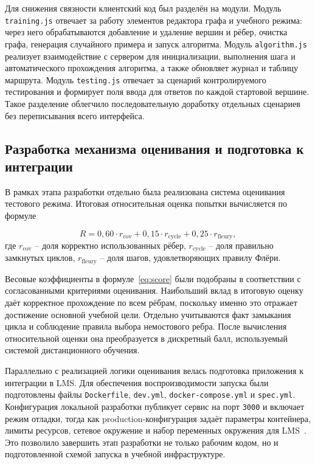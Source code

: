 \documentclass[a4paper,12pt]{extarticle}
\begin{document}
Для снижения связности клиентский код был разделён на модули. Модуль \texttt{training.js} отвечает за работу элементов редактора графа и учебного режима: через него обрабатываются добавление и удаление вершин и рёбер, очистка графа, генерация случайного примера и запуск алгоритма. Модуль \texttt{algorithm.js} реализует взаимодействие с сервером для инициализации, выполнения шага и автоматического прохождения алгоритма, а также обновляет журнал и таблицу маршрута. Модуль \texttt{testing.js} отвечает за сценарий контролируемого тестирования и формирует поля ввода для ответов по каждой стартовой вершине. Такое разделение облегчило последовательную доработку отдельных сценариев без переписывания всего интерфейса.

\subsection{Разработка механизма оценивания и подготовка к интеграции}

В рамках этапа разработки отдельно была реализована система оценивания тестового режима. Итоговая относительная оценка попытки вычисляется по формуле

\begin{equation}
R = 0{,}60 \cdot r_{\text{cov}} + 0{,}15 \cdot r_{\text{cycle}} + 0{,}25 \cdot r_{\text{fleury}},
\label{eq:score}
\end{equation}
где $r_{\text{cov}}$ -- доля корректно использованных рёбер, $r_{\text{cycle}}$ -- доля правильно замкнутых циклов, $r_{\text{fleury}}$ -- доля шагов, удовлетворяющих правилу Флёри.

Весовые коэффициенты в формуле~\eqref{eq:score} были подобраны в соответствии с согласованными критериями оценивания. Наибольший вклад в итоговую оценку даёт корректное прохождение по всем рёбрам, поскольку именно это отражает достижение основной учебной цели. Отдельно учитываются факт замыкания цикла и соблюдение правила выбора немостового ребра. После вычисления относительной оценки она преобразуется в дискретный балл, используемый системой дистанционного обучения.

Параллельно с реализацией логики оценивания велась подготовка приложения к интеграции в LMS. Для обеспечения воспроизводимости запуска были подготовлены файлы \texttt{Dockerfile}, \texttt{dev.yml}, \texttt{docker-compose.yml} и \texttt{spec.yml}. Конфигурация локальной разработки публикует сервис на порт \texttt{3000} и включает режим отладки, тогда как production-конфигурация задаёт параметры контейнера, лимиты ресурсов, сетевое окружение и набор переменных окружения для LMS~\cite{dockerdocs}. Это позволило завершить этап разработки не только рабочим кодом, но и подготовленной схемой запуска в учебной инфраструктуре.
\end{document}
